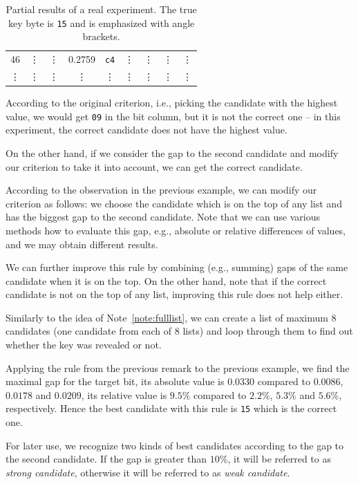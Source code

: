 \begin{example}
\begin{table}[H]
\begin{center}
\begin{tabular}{| c | c | c | c | c | c | c | c | c |}
					46     & \vdots & \vdots     & 0.2759 & {\tt c4}   & \vdots & \vdots     & \vdots & \vdots     \\
					\vdots & \vdots & \vdots     & \vdots & \vdots     & \vdots & \vdots     & \vdots & \vdots     \\
				\hline
			\end{tabular}
			\end{center}
		\caption{Partial results of a real experiment. The true key byte is {\tt 15} and is emphasized with angle brackets.}
		\label{tab:gap}
		\end{table}
		According to the original criterion, i.e., picking the candidate with the highest value, we would get {\tt 09} in the  bit column, but it is not the correct one -- in this experiment, the correct candidate does not have the highest value.
		
		On the other hand, if we consider the gap to the second candidate and modify our criterion to take it into account, we can get the correct candidate.
	\end{example}
	
	\begin{remark}
	\label{rem:gap}
		According to the observation in the previous example, we can modify our criterion as follows: we choose the candidate which is on the top of any list and has the biggest gap to the second candidate. Note that we can use various methods how to evaluate this gap, e.g., absolute or relative differences of values, and we may obtain different results.
		
		We can further improve this rule by combining (e.g., summing) gaps of the same candidate when it is on the top. On the other hand, note that if the correct candidate is not on the top of any list, improving this rule does not help either.
		
		Similarly to the idea of Note~\ref{note:fulllist}, we can create a list of maximum $8$ candidates (one candidate from each of $8$ lists) and loop through them to find out whether the key was revealed or not.
	\end{remark}
	
	Applying the rule from the previous remark to the previous example, we find the maximal gap for the  target bit, its absolute value is $0.0330$ compared to $0.0086$, $0.0178$ and $0.0209$, its relative value is $9.5\%$ compared to $2.2\%$, $5.3\%$ and $5.6\%$, respectively. Hence the best candidate with this rule is {\tt 15} which is the correct one.
	
	\begin{note}
	\label{note:strong}
		For later use, we recognize two kinds of best candidates according to the gap to the second candidate. If the gap is greater than $10\%$, it will be referred to as {\em strong candidate}, otherwise it will be referred to as {\em weak candidate}.
	\end{note}
